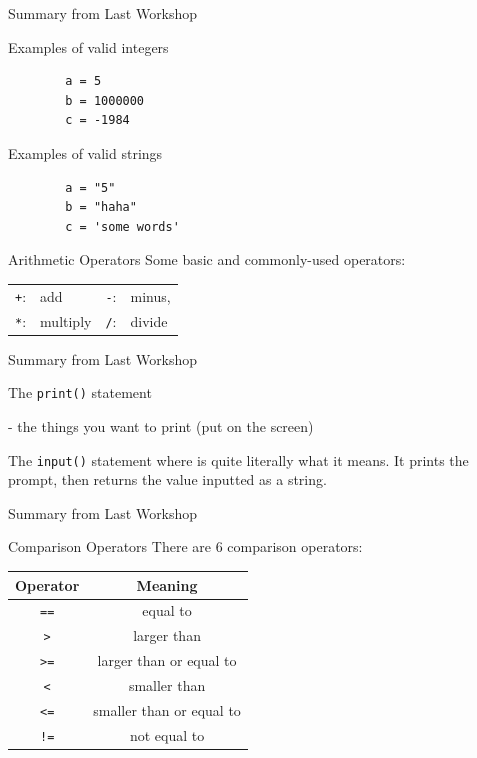 \documentclass[dvipsnames, svgnames, x11names]{beamer}
\begin{document}
\begin{frame}[fragile]{Summary from Last Workshop}
    \begin{block}{Examples of valid integers}
        \begin{verbatim}
        a = 5  
        b = 1000000   
        c = -1984
        \end{verbatim}
    \end{block}
    \begin{block}{Examples of valid strings}
        \begin{verbatim}
        a = "5"
        b = "haha"   
        c = 'some words'
        \end{verbatim}
    \end{block}
    \begin{block}{Arithmetic Operators}
        Some basic and commonly-used operators:\\
        \centering
        \begin{tabular}{rlrl}
        \texttt{+}:& add & \texttt{-}:& minus,\\
        \texttt{*}:& multiply & \texttt{/}:& divide
        \end{tabular}
    \end{block}
\end{frame}

\begin{frame}[fragile]{Summary from Last Workshop}
\begin{block}{The \texttt{print()} statement}

 - the things you want to print (put on the screen)
\end{block}

\begin{block}{The \texttt{input()} statement}
where  is quite literally what it means. It prints the prompt, then returns the value inputted as a string.
\end{block}
\end{frame}

\begin{frame}[fragile]{Summary from Last Workshop}
\begin{block}{Comparison Operators}
There are 6 comparison operators:
\begin{center}
\begin{tabular}{|c|c|}\hline
Operator & Meaning\\\hline
\texttt{==} & equal to\\\hline
\texttt{>} & larger than\\\hline
\texttt{>=} & larger than or equal to\\\hline
\texttt{<} & smaller than\\\hline
\texttt{<=} & smaller than or equal to\\\hline
\texttt{!=} & not equal to\\\hline
\end{tabular}
\end{center}
\end{block}
\end{frame}
\end{document}
